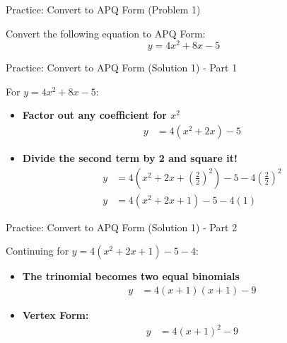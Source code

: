 \documentclass[aspectratio=169]{beamer}
\begin{document}
\begin{frame}{Practice: Convert to APQ Form (Problem 1)}
    \begin{tcolorbox}[colback=lightgray,colframe=primary,title=Problem 1]
        \footnotesize
        Convert the following equation to APQ Form:
        \[ y = 4x^2 + 8x - 5 \]
    \end{tcolorbox}
\end{frame}

\begin{frame}{Practice: Convert to APQ Form (Solution 1) - Part 1}
    \begin{tcolorbox}[colback=lightgray,colframe=accent,title=Solution 1 - Part 1]
        \footnotesize
        For $y = 4x^2 + 8x - 5$:
        \begin{itemize}
            \item \textbf{Factor out any coefficient for $x^2$}
                \begin{align*}
                    y &= 4(x^2 + 2x) - 5
                \end{align*}
            \item \textbf{Divide the second term by 2 and square it!}
                \begin{align*}
                    y &= 4\left(x^2 + 2x + \left(\frac{2}{2}\right)^2\right) - 5 - 4\left(\frac{2}{2}\right)^2 \\
                    y &= 4(x^2 + 2x + 1) - 5 - 4(1)
                \end{align*}
        \end{itemize}
    \end{tcolorbox}
\end{frame}

\begin{frame}{Practice: Convert to APQ Form (Solution 1) - Part 2}
    \begin{tcolorbox}[colback=lightgray,colframe=accent,title=Solution 1 - Part 2 (Cont.)]
        \footnotesize
        Continuing for $y = 4(x^2 + 2x + 1) - 5 - 4$:
        \begin{itemize}
            \item \textbf{The trinomial becomes two equal binomials}
                \begin{align*}
                    y &= 4(x+1)(x+1) - 9
                \end{align*}
            \item \textbf{Vertex Form:}
                \begin{align*}
                    y &= 4(x+1)^2 - 9
                \end{align*}
        \end{itemize}
    \end{tcolorbox}
\end{frame}
\end{document}
